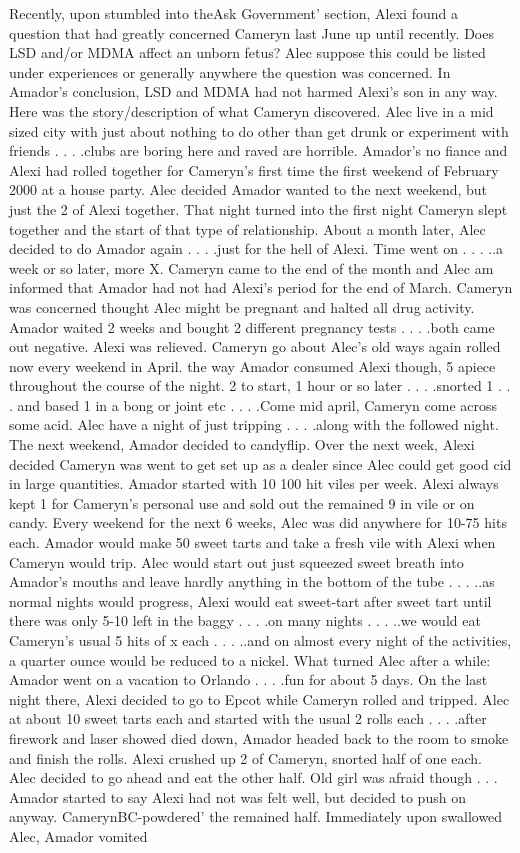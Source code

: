 \documentclass[12pt]{book}
\begin{document}
Recently, upon stumbled into theAsk Government' section, Alexi found a question that had greatly concerned Cameryn last June up until recently. Does LSD and/or MDMA affect an unborn fetus? Alec suppose this could be listed under experiences or generally anywhere the question was concerned. In Amador's conclusion, LSD and MDMA had not harmed Alexi's son in any way. Here was the story/description of what Cameryn discovered. Alec live in a mid sized city with just about nothing to do other than get drunk or experiment with friends . . .  .clubs are boring here and raved are horrible. Amador's no fiance and Alexi had rolled together for Cameryn's first time the first weekend of February 2000 at a house party. Alec decided Amador wanted to the next weekend, but just the 2 of Alexi together. That night turned into the first night Cameryn slept together and the start of that type of relationship. About a month later, Alec decided to do Amador again . . .  .just for the hell of Alexi. Time went on . . .  ..a week or so later, more X. Cameryn came to the end of the month and Alec am informed that Amador had not had Alexi's period for the end of March. Cameryn was concerned thought Alec might be pregnant and halted all drug activity. Amador waited 2 weeks and bought 2 different pregnancy tests . . .  .both came out negative. Alexi was relieved. Cameryn go about Alec's old ways again rolled now every weekend in April. the way Amador consumed Alexi though, 5 apiece throughout the course of the night. 2 to start, 1 hour or so later . . .  .snorted 1 . . .  and based 1 in a bong or joint etc . . .  .Come mid april, Cameryn come across some acid. Alec have a night of just tripping . . .  .along with the followed night. The next weekend, Amador decided to candyflip. Over the next week, Alexi decided Cameryn was went to get set up as a dealer since Alec could get good cid in large quantities. Amador started with 10 100 hit viles per week. Alexi always kept 1 for Cameryn's personal use and sold out the remained 9 in vile or on candy. Every weekend for the next 6 weeks, Alec was did anywhere for 10-75 hits each. Amador would make 50 sweet tarts and take a fresh vile with Alexi when Cameryn would trip. Alec would start out just squeezed sweet breath into Amador's mouths and leave hardly anything in the bottom of the tube . . .  ..as normal nights would progress, Alexi would eat sweet-tart after sweet tart until there was only 5-10 left in the baggy . . .  .on many nights . . .  ..we would eat Cameryn's usual 5 hits of x each . . .  ..and on almost every night of the activities, a quarter ounce would be reduced to a nickel. What turned Alec after a while: Amador went on a vacation to Orlando . . .  .fun for about 5 days. On the last night there, Alexi decided to go to Epcot while Cameryn rolled and tripped. Alec at about 10 sweet tarts each and started with the usual 2 rolls each . . .  .after firework and laser showed died down, Amador headed back to the room to smoke and finish the rolls. Alexi crushed up 2 of Cameryn, snorted half of one each. Alec decided to go ahead and eat the other half. Old girl was afraid though . . .  Amador started to say Alexi had not was felt well, but decided to push on anyway. CamerynBC-powdered' the remained half. Immediately upon swallowed Alec, Amador vomited 
\end{document}
